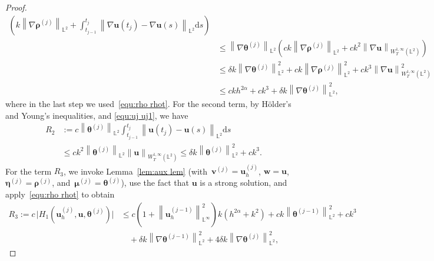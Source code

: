\documentclass[11pt,reqno]{amsart}
\theoremstyle{definition}
\numberwithin{equation}{section}
\newcommand{\bff}{\boldsymbol}
\newcommand{\bb}{\mathbb}
\newcommand{\ds}{\mathrm{d}s}
\newcommand{\nn}{\nonumber}
\newcommand{\norm}[2]{\left\|{#1}\right\|_{#2}}
\begin{document}
\begin{proof}
\begin{align}
	\left(
		 k \norm{\nabla\bff{\rho}^{(j)}}{\bb{L}^2} 
		+
		\int_{t_{j-1}}^{t_j}
		\norm{\nabla\bff{u}(t_j)-\nabla\bff{u}(s)}{\bb{L}^2} \ds
	\right)
	\nn\\
	&\leq
	\norm{\nabla\bff{\theta}^{(j)}}{\bb{L}^2} 
	\left(
		c k \norm{\nabla\bff{\rho}^{(j)}}{\bb{L}^2} 
		+
		c k^2 
		\norm{\nabla \bff{u}}{W^{1,\infty}_T(\bb{L}^2)} 
	\right)
	\nn\\
	&\leq
	\delta k \norm{\nabla\bff{\theta}^{(j)}}{\bb{L}^2}^2
	+
	ck \norm{\nabla \bff{\rho}^{(j)}}{\bb{L}^2}^2
	+ 
	ck^3 \norm{\nabla\bff{u}}{W^{1,\infty}_T(\bb{L}^2)}^2
	\nn\\
	&\leq
	ck h^{2\alpha} + ck^3
	+
	\delta k \norm{\nabla\bff{\theta}^{(j)}}{\bb{L}^2}^2,
\end{align}
where in the last step we used~\eqref{equ:rho rhot}.
For the second term, by H\"older's and Young's inequalities, and \eqref{equ:uj uj1}, we have
\begin{align*}
	R_2
	&:=
	c\norm{\bff{\theta}^{(j)}}{\bb{L}^2} 
	\int_{t_{j-1}}^{t_j} 
	\norm{\bff{u}(t_j)-\bff{u}(s)}{\bb{L}^2} \ds
	\\
	&\leq
	c k^2
	\norm{\bff{\theta}^{(j)}}{\bb{L}^2} 
	\norm{\bff{u}}{W^{1,\infty}_T(\bb{L}^2)}
	\le
	\delta k \norm{\bff{\theta}^{(j)}}{\bb{L}^2}^2
	+
	ck^3.
\end{align*}
For the term $R_3$, we invoke Lemma~\ref{lem:aux lem} (with~$\bff{v}^{(j)}=\bff{u}_h^{(j)}$,
$\bff{w}=\bff{u}$, $\bff{\eta}^{(j)}=\bff{\rho}^{(j)}$,
and~$\bff{\mu}^{(j)}=\bff{\theta}^{(j)}$), use the fact that $\bff{u}$ is a strong solution, and apply~\eqref{equ:rho rhot} to obtain 
\begin{align*}
	R_3
	:=
	c\, \big| H_1(\bff{u}_h^{(j)},\bff{u},\bff{\theta}^{(j)}) \big|
	&\le
	c\left(1+\norm{\bff{u}_h^{(j-1)}}{\bb{L}^\infty}^2\right) k (h^{2\alpha}+k^2) 
	+ ck \norm{\bff{\theta}^{(j-1)}}{\bb{L}^2}^2
	+ c k^3 
	\\
	&\quad
	+ \delta k \norm{\nabla \bff{\theta}^{(j-1)}}{\bb{L}^2}^2
	+ 4\delta k \norm{\nabla \bff{\theta}^{(j)}}{\bb{L}^2}^2,
\end{align*}

\end{proof}
\end{document}
